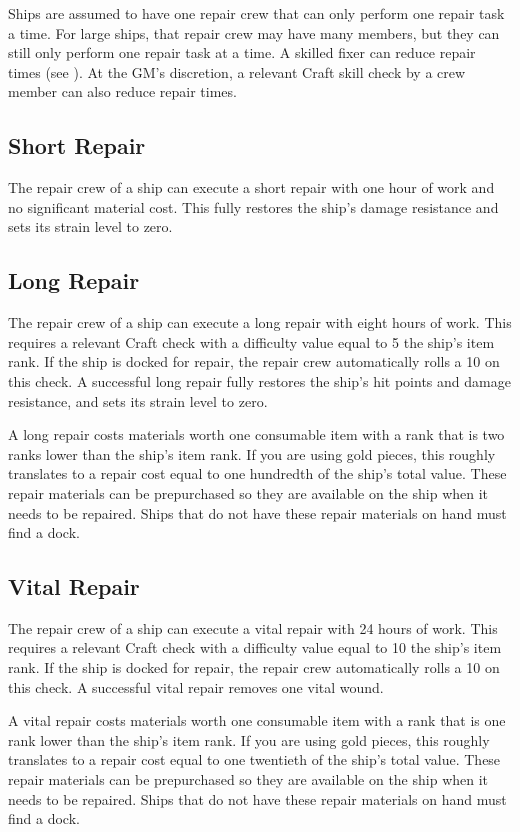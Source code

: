     Ships are assumed to have one repair crew that can only perform one repair task a time.
    For large ships, that repair crew may have many members, but they can still only perform one repair task at a time.
    A skilled fixer can reduce repair times (see ).
    At the GM's discretion, a relevant Craft skill check by a crew member can also reduce repair times.

    \subsection{Short Repair}
        The repair crew of a ship can execute a short repair with one hour of work and no significant material cost.
        This fully restores the ship's damage resistance and sets its strain level to zero.

    \subsection{Long Repair}
        The repair crew of a ship can execute a long repair with eight hours of work.
        This requires a relevant Craft check with a difficulty value equal to 5 \add the ship's item rank.
        If the ship is docked for repair, the repair crew automatically rolls a 10 on this check.
        A successful long repair fully restores the ship's hit points and damage resistance, and sets its strain level to zero.

        A long repair costs materials worth one consumable item with a rank that is two ranks lower than the ship's item rank.
        If you are using gold pieces, this roughly translates to a repair cost equal to one hundredth of the ship's total value.
        These repair materials can be prepurchased so they are available on the ship when it needs to be repaired.
        Ships that do not have these repair materials on hand must find a dock.

    \subsection{Vital Repair}
        The repair crew of a ship can execute a vital repair with 24 hours of work.
        This requires a relevant Craft check with a difficulty value equal to 10 \add the ship's item rank.
        If the ship is docked for repair, the repair crew automatically rolls a 10 on this check.
        A successful vital repair removes one vital wound.

        A vital repair costs materials worth one consumable item with a rank that is one rank lower than the ship's item rank.
        If you are using gold pieces, this roughly translates to a repair cost equal to one twentieth of the ship's total value.
        These repair materials can be prepurchased so they are available on the ship when it needs to be repaired.
        Ships that do not have these repair materials on hand must find a dock.

